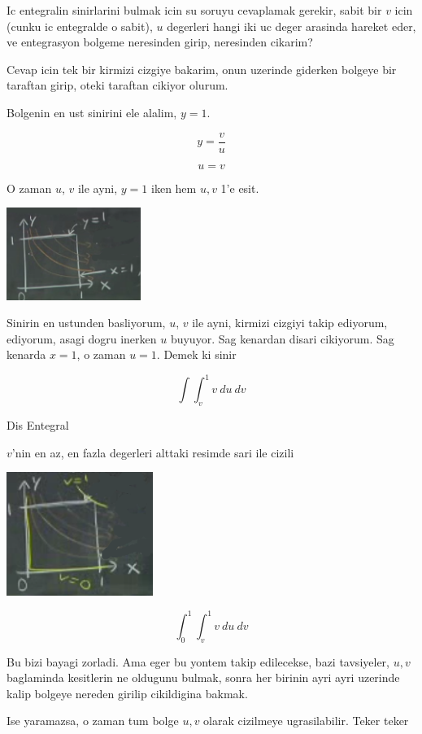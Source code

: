 \documentclass[12pt,fleqn]{article}\usepackage{../common}
\begin{document}
Ic entegralin sinirlarini bulmak icin su soruyu cevaplamak gerekir, sabit
bir $v$ icin (cunku ic entegralde o sabit), $u$ degerleri hangi iki uc
deger arasinda hareket eder, ve entegrasyon bolgeme neresinden girip,
neresinden cikarim? 

Cevap icin tek bir kirmizi cizgiye bakarim, onun uzerinde giderken bolgeye
bir taraftan girip, oteki taraftan cikiyor olurum. 

Bolgenin en ust sinirini ele alalim, $y=1$. 

\[ y = \frac{v}{u}  \]

\[ u = v \]

O zaman $u$, $v$ ile ayni, $y=1$ iken hem $u,v$ 1'e esit.

\includegraphics[height=3cm]{18_7.png}

Sinirin en ustunden basliyorum, $u$, $v$ ile ayni, kirmizi cizgiyi takip
ediyorum, ediyorum, asagi dogru inerken $u$ buyuyor. Sag kenardan disari
cikiyorum. Sag kenarda $x=1$, o zaman $u = 1$. Demek ki sinir

\[ \int \int _v^1 v \ du \ dv \]

Dis Entegral 

$v$'nin en az, en fazla degerleri alttaki resimde sari ile cizili

\includegraphics[height=4cm]{18_8.png}

\[ \int_0^1 \int _v^1 v \ du \ dv \]

Bu bizi bayagi zorladi. Ama eger bu yontem takip edilecekse, bazi
tavsiyeler, $u,v$ baglaminda kesitlerin ne oldugunu bulmak, sonra her
birinin ayri ayri uzerinde kalip bolgeye nereden girilip cikildigina
bakmak. 

Ise yaramazsa, o zaman tum bolge $u,v$ olarak cizilmeye
ugrasilabilir. Teker teker 
\end{document}
